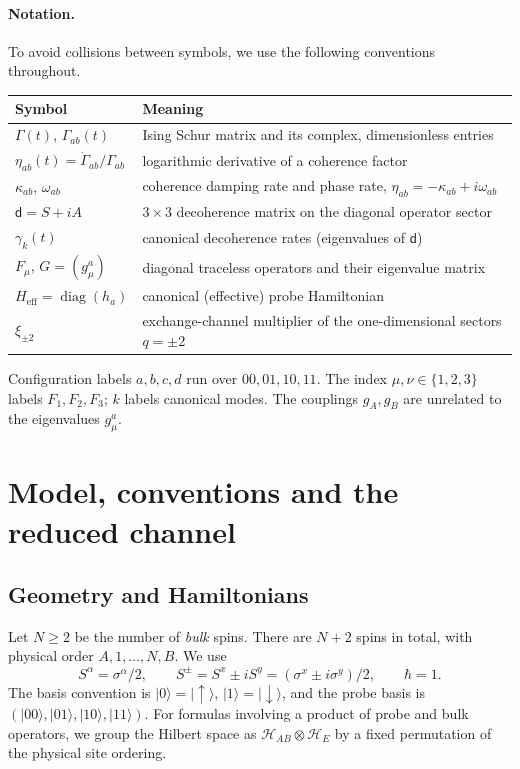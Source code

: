 \documentclass[11pt,a4paper]{article}
\newcommand{\ket}[1]{\lvert #1\rangle}
\newcommand{\diag}{\operatorname{diag}}
\newcommand{\HH}{\mathcal H}
\newcommand{\dmat}{\mathsf d}
\newcommand{\Heff}{H_{\mathrm{eff}}}
\begin{document}
\paragraph{Notation.}
To avoid collisions between symbols, we use the following conventions
throughout.
\begin{center}
\begin{tabular}{@{}ll@{}}
\toprule
Symbol & Meaning\\\midrule
$\Gamma(t)$, $\Gamma_{ab}(t)$ & Ising Schur matrix and its complex, dimensionless entries\\
$\eta_{ab}(t)=\dot\Gamma_{ab}/\Gamma_{ab}$ & logarithmic derivative of a coherence factor\\
$\kappa_{ab}$, $\omega_{ab}$ & coherence damping rate and phase rate, $\eta_{ab}=-\kappa_{ab}+i\omega_{ab}$\\
$\dmat=S+iA$ & $3\times3$ decoherence matrix on the diagonal operator sector\\
$\gamma_k(t)$ & canonical decoherence rates (eigenvalues of $\dmat$)\\
$F_\mu$, $G=(g^a_\mu)$ & diagonal traceless operators and their eigenvalue matrix\\
$\Heff=\diag(h_a)$ & canonical (effective) probe Hamiltonian\\
$\xi_{\pm2}$ & exchange-channel multiplier of the one-dimensional sectors $q=\pm2$\\
\bottomrule
\end{tabular}
\end{center}
Configuration labels $a,b,c,d$ run over $00,01,10,11$. The index
$\mu,\nu\in\{1,2,3\}$ labels $F_1,F_2,F_3$; $k$ labels canonical modes.
The couplings $g_A,g_B$ are unrelated to the eigenvalues $g^a_\mu$.

\section{Model, conventions and the reduced channel}
\label{sec:model}

\subsection{Geometry and Hamiltonians}

Let $N\ge2$ be the number of \emph{bulk} spins. There are $N+2$ spins in
total, with physical order $A,1,\ldots,N,B$. We use
\begin{equation}
 S^\alpha=\sigma^\alpha/2,\qquad
 S^\pm=S^x\pm iS^y=(\sigma^x\pm i\sigma^y)/2,\qquad \hbar=1.
\end{equation}
The basis convention is $\ket0=\ket\uparrow$, $\ket1=\ket\downarrow$,
and the probe basis is $(\ket{00},\ket{01},\ket{10},\ket{11})$.
For formulas involving a product of probe and bulk operators, we group
the Hilbert space as $\HH_{AB}\otimes\HH_E$ by a fixed permutation
of the physical site ordering.
\end{document}
